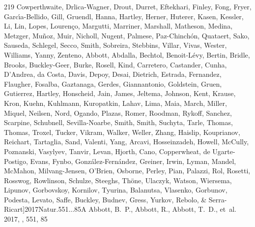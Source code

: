\documentclass{aa}
\begin{document}
\begin{thebibliography}{219}
{		{Cowperthwaite}, {Drlica-Wagner}, {Drout}, {Durret}, {Eftekhari}, {Finley}, {Fong}, {Fryer}, {Garc{\'\i}a-Bellido}, {Gill}, {Gruendl}, {Hanna}, {Hartley}, {Herner}, {Huterer}, {Kasen}, {Kessler}, {Li}, {Lin}, {Lopes}, {Louren{\c{c}}o}, {Margutti}, {Marriner}, {Marshall}, {Matheson}, {Medina}, {Metzger}, {Mu{\~n}oz}, {Muir}, {Nicholl}, {Nugent}, {Palmese}, {Paz-Chinch{\'o}n}, {Quataert}, {Sako}, {Sauseda}, {Schlegel}, {Secco}, {Smith}, {Sobreira}, {Stebbins}, {Villar}, {Vivas}, {Wester}, {Williams}, {Yanny}, {Zenteno}, {Abbott}, {Abdalla}, {Bechtol}, {Benoit-L{\'e}vy}, {Bertin}, {Bridle}, {Brooks}, {Buckley-Geer}, {Burke}, {Rosell}, {Kind}, {Carretero}, {Castander}, {Cunha}, {D'Andrea}, {da Costa}, {Davis}, {Depoy}, {Desai}, {Dietrich}, {Estrada}, {Fernandez}, {Flaugher}, {Fosalba}, {Gaztanaga}, {Gerdes}, {Giannantonio}, {Goldstein}, {Gruen}, {Gutierrez}, {Hartley}, {Honscheid}, {Jain}, {James}, {Jeltema}, {Johnson}, {Kent}, {Krause}, {Kron}, {Kuehn}, {Kuhlmann}, {Kuropatkin}, {Lahav}, {Lima}, {Maia},
		{March}, {Miller}, {Miquel}, {Neilsen}, {Nord}, {Ogando}, {Plazas}, {Romer}, {Roodman}, {Rykoff}, {Sanchez}, {Scarpine}, {Schubnell}, {Sevilla-Noarbe}, {Smith}, {Smith}, {Suchyta}, {Tarle}, {Thomas}, {Thomas}, {Troxel}, {Tucker}, {Vikram}, {Walker}, {Weller}, {Zhang}, {Haislip}, {Kouprianov}, {Reichart}, {Tartaglia}, {Sand}, {Valenti}, {Yang}, {Arcavi}, {Hosseinzadeh}, {Howell}, {McCully}, {Poznanski}, {Vasylyev}, {Tanvir}, {Levan}, {Hjorth}, {Cano}, {Copperwheat}, {de Ugarte-Postigo}, {Evans}, {Fynbo}, {Gonz{\'a}lez-Fern{\'a}ndez}, {Greiner}, {Irwin}, {Lyman}, {Mandel}, {McMahon}, {Milvang-Jensen}, {O'Brien}, {Osborne}, {Perley}, {Pian}, {Palazzi}, {Rol}, {Rosetti}, {Rosswog}, {Rowlinson}, {Schulze}, {Steeghs}, {Th{\"o}ne}, {Ulaczyk}, {Watson}, {Wiersema}, {Lipunov}, {Gorbovskoy}, {Kornilov}, {Tyurina}, {Balanutsa}, {Vlasenko}, {Gorbunov}, {Podesta}, {Levato}, {Saffe}, {Buckley}, {Budnev}, {Gress}, {Yurkov}, {Rebolo}, \& {Serra-Ricart}}]{2017Natur.551...85A}
	{Abbott}, B.~P., {Abbott}, R., {Abbott}, T.~D., {et~al.} 2017, \nat, 551, 85
	

\end{thebibliography}
\end{document}
